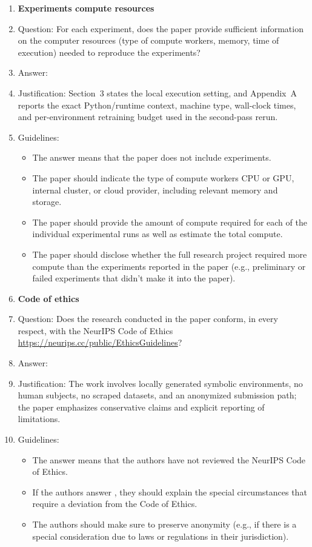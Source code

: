\documentclass{article}
\begin{document}
\begin{enumerate}
\item {\bf Experiments compute resources}
    \item[] Question: For each experiment, does the paper provide sufficient information on the computer resources (type of compute workers, memory, time of execution) needed to reproduce the experiments?
    \item[] Answer: \answerYes{}
    \item[] Justification: Section~3 states the local execution setting, and Appendix~A reports the exact Python/runtime context, machine type, wall-clock times, and per-environment retraining budget used in the second-pass rerun.
    \item[] Guidelines:
    \begin{itemize}
        \item The answer \answerNA{} means that the paper does not include experiments.
        \item The paper should indicate the type of compute workers CPU or GPU, internal cluster, or cloud provider, including relevant memory and storage.
        \item The paper should provide the amount of compute required for each of the individual experimental runs as well as estimate the total compute.
        \item The paper should disclose whether the full research project required more compute than the experiments reported in the paper (e.g., preliminary or failed experiments that didn't make it into the paper).
    \end{itemize}

\item {\bf Code of ethics}
    \item[] Question: Does the research conducted in the paper conform, in every respect, with the NeurIPS Code of Ethics \url{https://neurips.cc/public/EthicsGuidelines}?
    \item[] Answer: \answerYes{}
    \item[] Justification: The work involves locally generated symbolic environments, no human subjects, no scraped datasets, and an anonymized submission path; the paper emphasizes conservative claims and explicit reporting of limitations.
    \item[] Guidelines:
    \begin{itemize}
        \item The answer \answerNA{} means that the authors have not reviewed the NeurIPS Code of Ethics.
        \item If the authors answer \answerNo, they should explain the special circumstances that require a deviation from the Code of Ethics.
        \item The authors should make sure to preserve anonymity (e.g., if there is a special consideration due to laws or regulations in their jurisdiction).
    \end{itemize}


\end{enumerate}
\end{document}
